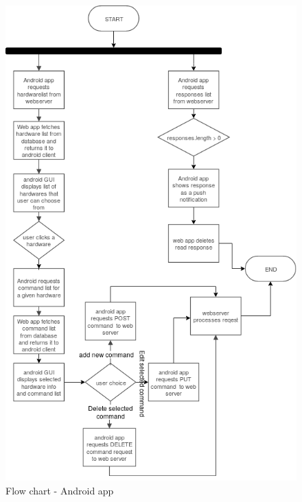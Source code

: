 \documentclass[12pt, oneside, a4paper]{book}
\begin{document}
				\begin{figure}[H]
					\caption{Flow chart - Android app}
					\label{fig:ig:flow_android}
					\includegraphics[width=\linewidth]{img/flowchart_android.png}
				\end{figure}
\end{document}
